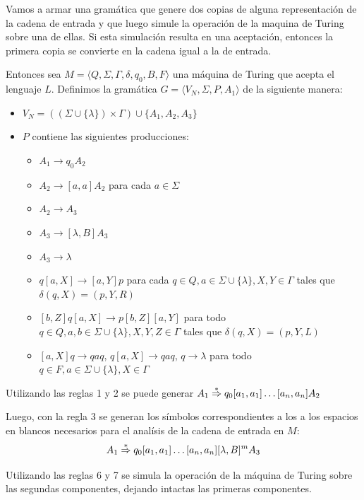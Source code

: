 \begin{demo}[0.8\textwidth]
  Vamos a armar una gramática que genere dos copias de alguna representación de la cadena de entrada y que luego simule la operación de la maquina de Turing sobre una de ellas. Si esta simulación resulta en una aceptación, entonces la primera copia se convierte en la cadena igual a la de entrada.
\end{demo}
\begin{demoPart}[0.9\textwidth]
  Entonces sea \(M= \langle Q, \Sigma, \Gamma, \delta, q_0, B, F\rangle\) una máquina de Turing que acepta el lenguaje \(L\). Definimos la gramática \(G = \langle V_N, \Sigma, P, A_1  \rangle\) de la siguiente manera:
  \begin{itemize}
    \item \(V_N = ((\Sigma\cup\{\lambda\})\times\Gamma)\cup\{A_1,A_2,A_3\}\)
    \item \(P\) contiene las siguientes producciones:
          \begin{itemize}
            \item \(A_1 \rightarrow q_0A_2\)
            \item  \(A_2 \rightarrow [a,a]A_2\) para cada \(a\in\Sigma\)
            \item \(A_2\to A_3\)
            \item \(A_3\to [\lambda, B]A_3\)
            \item \(A_3\to \lambda\)
            \item \(q[a,X]\to [a, Y]p\) para cada \(q\in Q, a\in\Sigma\cup\{\lambda\}, X,Y\in\Gamma\) tales que \(\delta(q,X) = (p,Y, R)\)
            \item \([b, Z]q[a,X]\to p[b,Z][a, Y]\) para todo \(q\in Q, a,b\in\Sigma\cup\{\lambda\}, X,Y,Z\in\Gamma\) tales que \(\delta(q,X) = (p,Y, L)\)
            \item \([a,X]q\to qaq\), \(q[a,X]\to qaq\), \(q\to\lambda\) para todo \(q\in F, a\in\Sigma\cup\{\lambda\}, X\in\Gamma\)
          \end{itemize}
  \end{itemize}
  Utilizando las reglas 1 y 2 se puede generar \(A_1 \overset{*}{\Rightarrow} q_0[a_1,a_1]\dots[a_n,a_n]A_2\)

  Luego, con la regla 3 se generan los símbolos correspondientes a los a los espacios en blancos necesarios para el analísis de la cadena de entrada en \(M\):
  \[ A_1 \overset{*}{\Rightarrow} q_0[a_1,a_1]\dots[a_n,a_n][\lambda, B]^mA_3\]

  Utilizando las reglas 6 y 7 se simula la operación de la máquina de Turing sobre las segundas componentes, dejando intactas las primeras componentes.


\end{demoPart}
